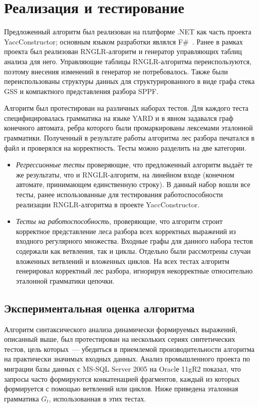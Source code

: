 \section{Реализация и тестирование}
Предложенный алгоритм был реализован на платформе .NET как часть проекта YaccConstructor; основным языком разработки являлся F\#~\cite{FSharp}. Ранее в рамках проекта был реализован RNGLR-алгоритм и генератор управляющих таблиц анализа для него. Управляющие таблицы RNGLR-алгоритма переиспользуются, поэтому внесения изменений в генератор не потребовалось. Также были переиспользованы структуры данных для структурированного в виде графа стека GSS и компактного представления разбора SPPF. 

Алгоритм был протестирован на различных наборах тестов. Для каждого теста специфицировалась грамматика на языке YARD и в явном задавался граф конечного автомата, ребра которого были промаркированы лексемами эталонной грамматики. Полученный в результате работы алгоритма лес разбора печатался в файл и проверялся на корректность. Тесты можно разделить на две категории.
\begin{itemize}
  \item \emph{Регрессионные тесты} проверяющие, что предложенный алгоритм выдаёт те же результаты, что и RNGLR-алгоритм, на линейном входе (конечном автомате, принимающем единственную строку). В данный набор вошли все тесты, ранее использованные для тестирования работоспособности реализации RNGLR-алгоритма в проекте YaccConstructor. 
  \item \emph{Тесты на работоспособность}, проверяющие, что алгоритм строит корректное представление леса разбора всех корректных выражений из входного регулярного множества. Входные графы для данного набора тестов содержали как ветвления, так и циклы. Отдельно были рассмотрены случаи вложенных ветвлений и вложенных циклов. На всех тестах алгоритм генерировал корректный лес разбора, игнорируя некорректные относительно эталонной грамматики цепочки.
\end{itemize}


\subsection{Экспериментальная оценка алгоритма}\label{SyntTestsEvalDescr}

Алгоритм синтаксического анализа динамически формируемых выражений, описанный выше, был протестирован на нескольких сериях синтетических тестов, цель которых~--- убедиться в приемлемой производительности алгоритма на практически значимых входных данных. Анализ промышленного проекта по миграции базы данных с MS-SQL Server 2005 на Oraclе 11gR2 показал, что запросы часто формируются конкатенацией фрагментов, каждый из которых формируется с помощью ветвлений или циклов. Ниже приведена эталонная грамматика $G_t$, использованная в этих тестах.

